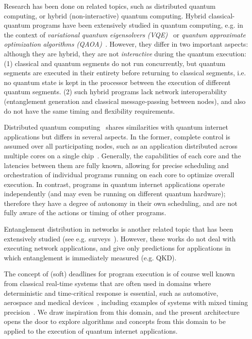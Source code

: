 Research has been done on related topics, such as distributed quantum computing, or hybrid (non-interactive) quantum computing. Hybrid classical-quantum programs have been extensively studied in quantum computing, e.g. in the context of \textit{variational quantum eigensolvers (VQE)}~\cite{diadamo2021distributed, liu2022layer} or \textit{quantum approximate optimization algorithms (QAOA)}~\cite{farhi2014quantum}. However, they differ in two important aspects: although they are hybrid, they are not \textit{interactive} during the quantum execution:
(1) classical and quantum segments do not run concurrently, but quantum segments are executed in their entirety before returning to classical segments, i.e. no quantum state is kept in the processor between the execution of different quantum segments.
(2) such hybrid programs lack network interoperability (entanglement generation and classical message-passing between nodes), and also do not have the same timing and flexibility requirements.

Distributed quantum computing~\cite{cacciapuoti2019quantum} shares similarities with quantum internet applications but differs in several aspects.
In the former, complete control is assumed over all participating nodes, such as an application distributed across multiple cores on a single chip~\cite{ovide2023mapping, jnane2022multicore}.
Generally, the capabilities of each core and the latencies between them are fully known, allowing for precise scheduling and orchestration of individual programs running on each core to optimize overall execution.
In contrast, programs in quantum internet applications operate independently (and may even be running on different quantum hardware); therefore they have a degree of autonomy in their own scheduling, and are not fully aware of the actions or timing of other programs.

Entanglement distribution in networks is another related topic that has been extensively studied (see e.g. surveys~\cite{wei2022towards, azuma2021tools}).
However, these works do not deal with executing network applications, and give only predictions for applications in which entanglement is immediately measured (e.g. QKD).

The concept of (soft) deadlines for program execution is of course well known from classical real-time systems that are often used in domains where deterministic and time-critical response is essential, such as automotive, aerospace and medical devices~\cite{liu1973scheduling, hambarde2014survey, buttazzo2011hard}, including examples of systems with mixed timing precision~\cite{burns2017survey}.
We draw inspiration from this domain, and the present architecture opens the door to explore algorithms and concepts from this domain to be applied to the execution of quantum internet applications.
